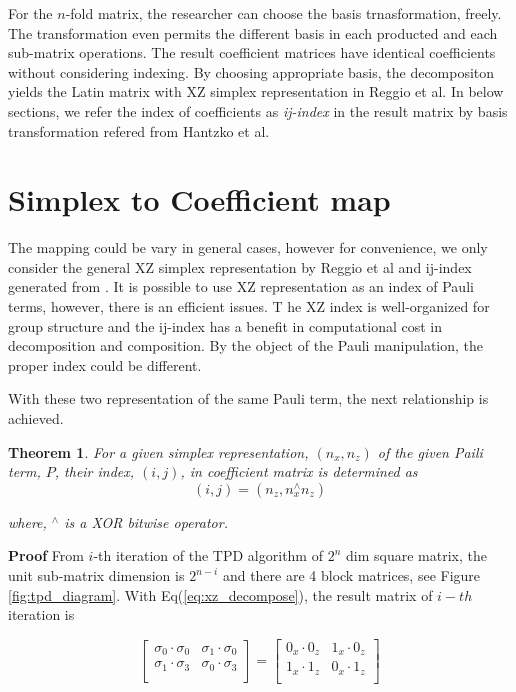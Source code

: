 \documentclass[twocolumn]{article}
\newtheorem{theorem}{Theorem}
\begin{document}
For the $n$-fold matrix, the researcher can choose the basis trnasformation, freely.
The transformation even permits the different basis in each producted and each sub-matrix
operations. The result coefficient matrices have identical coefficients without considering indexing.
By choosing appropriate basis, the decompositon yields the Latin matrix with XZ simplex representation
in Reggio et al\cite{reggio_fast_2023}.
In below sections, we refer the index of coefficients as \textit{ij-index} in the result matrix by basis transformation refered from Hantzko et al.

\section{Simplex to Coefficient map}

The mapping could be vary in general cases, however for convenience, we only consider
the general XZ simplex representation by Reggio et al\cite{reggio_fast_2023} and 
ij-index generated from \cite{hantzko_tensorized_2023}.
It is possible to use XZ representation as an index of Pauli terms, 
however, there is an efficient issues.
T he XZ index is well-organized for group structure and 
the ij-index has a benefit in computational cost in decomposition and composition.
By the object of the Pauli manipulation, the proper index could be different.

With these two representation of the same Pauli term, the next relationship is achieved.

\begin{theorem}
    For a given simplex representation, $(n_x, n_z)$ of the given Paili term, $P$,
    their index, $(i, j)$, in coefficient matrix is determined as 
    $$(i, j) = (n_z, n_x^\wedge n_z)$$

    where, ${}^\wedge$ is a XOR bitwise operator. 
\end{theorem}

\textbf{Proof} 
From $i$-th iteration of the TPD algorithm of $2^n$ dim square matrix, 
the unit sub-matrix dimension is $2^{n-i}$ and there are 4 block matrices, see Figure \ref{fig:tpd_diagram}.
With Eq(\ref{eq:xz_decompose}), the result matrix of $i-th$ iteration is

\begin{equation}
    \begin{bmatrix}
        \sigma_0 \cdot \sigma_0 & \sigma_1 \cdot \sigma_0\\
        \sigma_1 \cdot \sigma_3 & \sigma_0 \cdot \sigma_3\\
    \end{bmatrix}
    = 
    \begin{bmatrix}
        0_x \cdot 0_z & 1_x \cdot 0_z\\
        1_x \cdot 1_z & 0_x \cdot 1_z\\
    \end{bmatrix}
\end{equation}
\end{document}
